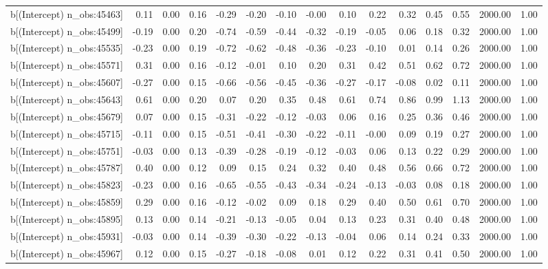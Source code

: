 \begin{table}[ht]
\begin{tabular}{rrrrrrrrrrrrrrr}
  b[(Intercept) n\_obs:45463] & 0.11 & 0.00 & 0.16 & -0.29 & -0.20 & -0.10 & -0.00 & 0.10 & 0.22 & 0.32 & 0.45 & 0.55 & 2000.00 & 1.00 \\ 
  b[(Intercept) n\_obs:45499] & -0.19 & 0.00 & 0.20 & -0.74 & -0.59 & -0.44 & -0.32 & -0.19 & -0.05 & 0.06 & 0.18 & 0.32 & 2000.00 & 1.00 \\ 
  b[(Intercept) n\_obs:45535] & -0.23 & 0.00 & 0.19 & -0.72 & -0.62 & -0.48 & -0.36 & -0.23 & -0.10 & 0.01 & 0.14 & 0.26 & 2000.00 & 1.00 \\ 
  b[(Intercept) n\_obs:45571] & 0.31 & 0.00 & 0.16 & -0.12 & -0.01 & 0.10 & 0.20 & 0.31 & 0.42 & 0.51 & 0.62 & 0.72 & 2000.00 & 1.00 \\ 
  b[(Intercept) n\_obs:45607] & -0.27 & 0.00 & 0.15 & -0.66 & -0.56 & -0.45 & -0.36 & -0.27 & -0.17 & -0.08 & 0.02 & 0.11 & 2000.00 & 1.00 \\ 
  b[(Intercept) n\_obs:45643] & 0.61 & 0.00 & 0.20 & 0.07 & 0.20 & 0.35 & 0.48 & 0.61 & 0.74 & 0.86 & 0.99 & 1.13 & 2000.00 & 1.00 \\ 
  b[(Intercept) n\_obs:45679] & 0.07 & 0.00 & 0.15 & -0.31 & -0.22 & -0.12 & -0.03 & 0.06 & 0.16 & 0.25 & 0.36 & 0.46 & 2000.00 & 1.00 \\ 
  b[(Intercept) n\_obs:45715] & -0.11 & 0.00 & 0.15 & -0.51 & -0.41 & -0.30 & -0.22 & -0.11 & -0.00 & 0.09 & 0.19 & 0.27 & 2000.00 & 1.00 \\ 
  b[(Intercept) n\_obs:45751] & -0.03 & 0.00 & 0.13 & -0.39 & -0.28 & -0.19 & -0.12 & -0.03 & 0.06 & 0.13 & 0.22 & 0.29 & 2000.00 & 1.00 \\ 
  b[(Intercept) n\_obs:45787] & 0.40 & 0.00 & 0.12 & 0.09 & 0.15 & 0.24 & 0.32 & 0.40 & 0.48 & 0.56 & 0.66 & 0.72 & 2000.00 & 1.00 \\ 
  b[(Intercept) n\_obs:45823] & -0.23 & 0.00 & 0.16 & -0.65 & -0.55 & -0.43 & -0.34 & -0.24 & -0.13 & -0.03 & 0.08 & 0.18 & 2000.00 & 1.00 \\ 
  b[(Intercept) n\_obs:45859] & 0.29 & 0.00 & 0.16 & -0.12 & -0.02 & 0.09 & 0.18 & 0.29 & 0.40 & 0.50 & 0.61 & 0.70 & 2000.00 & 1.00 \\ 
  b[(Intercept) n\_obs:45895] & 0.13 & 0.00 & 0.14 & -0.21 & -0.13 & -0.05 & 0.04 & 0.13 & 0.23 & 0.31 & 0.40 & 0.48 & 2000.00 & 1.00 \\ 
  b[(Intercept) n\_obs:45931] & -0.03 & 0.00 & 0.14 & -0.39 & -0.30 & -0.22 & -0.13 & -0.04 & 0.06 & 0.14 & 0.24 & 0.33 & 2000.00 & 1.00 \\ 
  b[(Intercept) n\_obs:45967] & 0.12 & 0.00 & 0.15 & -0.27 & -0.18 & -0.08 & 0.01 & 0.12 & 0.22 & 0.31 & 0.41 & 0.50 & 2000.00 & 1.00 \\ 

\end{tabular}
\end{table}
